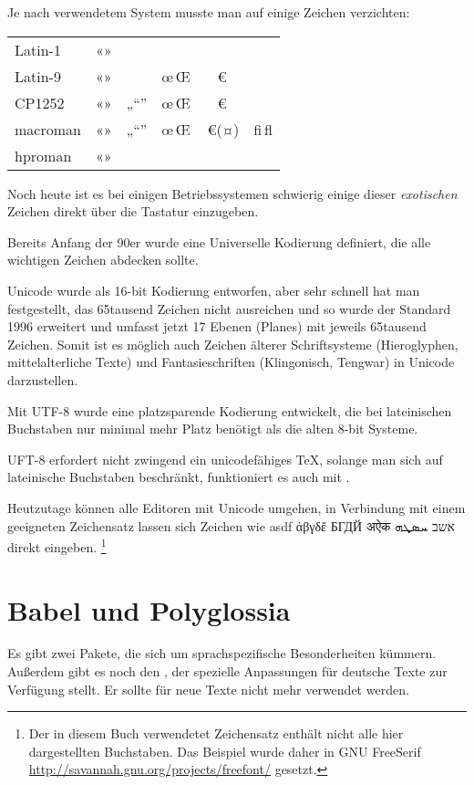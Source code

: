 Je nach verwendetem System musste man auf einige Zeichen verzichten:

\begin{tabular}{lccccc}
    Latin-1		& «» 	& 		&	&	&	\\
    Latin-9		& «» 	&		& œ\,Œ	& €	&	\\
    CP1252		& «» 	& „“”	& œ\,Œ	& €	&	\\
    macroman	& «» 	& „“”	& œ\,Œ	& €(¤)	& ﬁ\,ﬂ	\\
    hproman		& «» 	& 		&	&	&	\\
\end{tabular}

Noch heute ist es bei einigen Betriebssystemen schwierig einige dieser 
\emph{exotischen} Zeichen direkt über die Tastatur einzugeben.

Bereits Anfang der 90er wurde eine Universelle Kodierung definiert,
die alle wichtigen Zeichen abdecken sollte.

Unicode wurde als 16-bit Kodierung entworfen, aber sehr schnell hat man festgestellt,
das 65tausend Zeichen nicht ausreichen und so wurde der Standard 1996
erweitert und umfasst jetzt 17 Ebenen (Planes) mit jeweils 65tausend
Zeichen. Somit ist es möglich auch Zeichen älterer Schriftsysteme
(Hieroglyphen, mittelalterliche Texte) und Fantasieschriften (Klingonisch,
Tengwar) in Unicode darzustellen.

Mit UTF-8 wurde eine platzsparende Kodierung entwickelt, die bei lateinischen Buchstaben
nur minimal mehr Platz benötigt als die alten 8-bit Systeme.

UFT-8 erfordert nicht zwingend ein unicodefähiges \TeX{}, solange man sich auf
lateinische Buchstaben beschränkt, funktioniert es auch mit \pdfTeX{}.

Heutzutage können alle Editoren mit Unicode umgehen, in Verbindung mit einem geeigneten
Zeichensatz lassen sich Zeichen wie {\FSEfont asdf άβγδἔ БГДЙ अऐक אשב ܚܤܜܗ} direkt eingeben.%
\footnote{Der in diesem Buch verwendetet Zeichensatz enthält nicht alle hier dargestellten Buchstaben.
Das Beispiel wurde daher in GNU FreeSerif \url{http://savannah.gnu.org/projects/freefont/} gesetzt.}

\section{Babel und Polyglossia}

Es gibt zwei Pakete, die sich um sprachspezifische Besonderheiten kümmern.
Außerdem gibt es noch den , der spezielle Anpassungen für deutsche Texte
zur Verfügung stellt. Er sollte für neue Texte nicht mehr verwendet werden.

